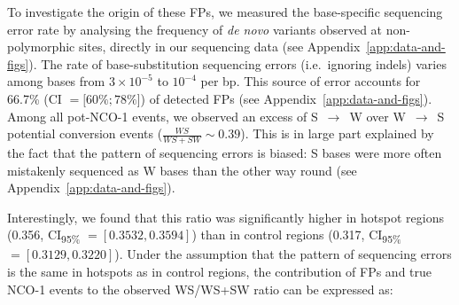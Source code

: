 %
%


To investigate the origin of these FPs, we measured the base-specific sequencing error rate by analysing the frequency of \textit{de novo} variants observed at non-polymorphic sites, directly in our sequencing data (see Appendix~\ref{app:data-and-figs}). 
The rate of base-substitution sequencing errors (i.e.\ ignoring indels) varies among bases from $3\times10^{-5}$ to $10^{-4}$ per bp. 
This source of error accounts for 66.7\% (CI $= [60\%; 78\%$]) of detected FPs (see Appendix~\ref{app:data-and-figs}).
Among all pot-NCO-1 events, we observed an excess of S~$\rightarrow$~W over W~$\rightarrow$~S potential conversion events ($\frac{WS}{WS+SW} \sim 0.39$). 
This is in large part explained by the fact that the pattern of sequencing errors is biased: S bases were more often mistakenly sequenced as W bases than the other way round (see Appendix~\ref{app:data-and-figs}). 

Interestingly, we found that this ratio was significantly higher in hotspot regions (0.356, CI\textsubscript{95\%} $=[0.3532, 0.3594]$) than in control regions (0.317, CI\textsubscript{95\%} $=[0.3129,0.3220]$).
Under the assumption that the pattern of sequencing errors is the same in hotspots as in control regions, the contribution of FPs and true NCO-1 events to the observed WS/WS+SW ratio can be expressed as:






